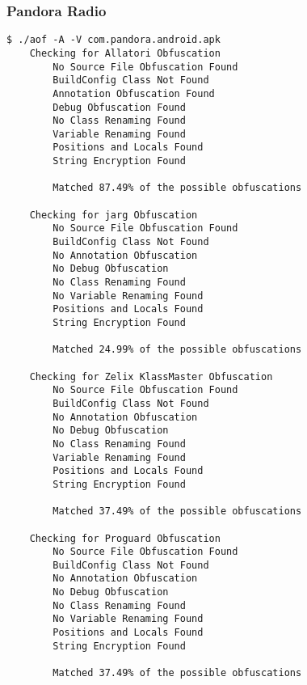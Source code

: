 \subsubsection{Pandora Radio\cite{pandora}}
\label{app:apandora}
\begin{lstlisting}
$ ./aof -A -V com.pandora.android.apk
    Checking for Allatori Obfuscation
        No Source File Obfuscation Found
        BuildConfig Class Not Found
        Annotation Obfuscation Found
        Debug Obfuscation Found
        No Class Renaming Found
        Variable Renaming Found
        Positions and Locals Found
        String Encryption Found

        Matched 87.49% of the possible obfuscations

    Checking for jarg Obfuscation
        No Source File Obfuscation Found
        BuildConfig Class Not Found
        No Annotation Obfuscation
        No Debug Obfuscation
        No Class Renaming Found
        No Variable Renaming Found
        Positions and Locals Found
        String Encryption Found

        Matched 24.99% of the possible obfuscations

    Checking for Zelix KlassMaster Obfuscation
        No Source File Obfuscation Found
        BuildConfig Class Not Found
        No Annotation Obfuscation
        No Debug Obfuscation
        No Class Renaming Found
        Variable Renaming Found
        Positions and Locals Found
        String Encryption Found

        Matched 37.49% of the possible obfuscations

    Checking for Proguard Obfuscation
        No Source File Obfuscation Found
        BuildConfig Class Not Found
        No Annotation Obfuscation
        No Debug Obfuscation
        No Class Renaming Found
        No Variable Renaming Found
        Positions and Locals Found
        String Encryption Found

        Matched 37.49% of the possible obfuscations
\end{lstlisting}
\newpage
